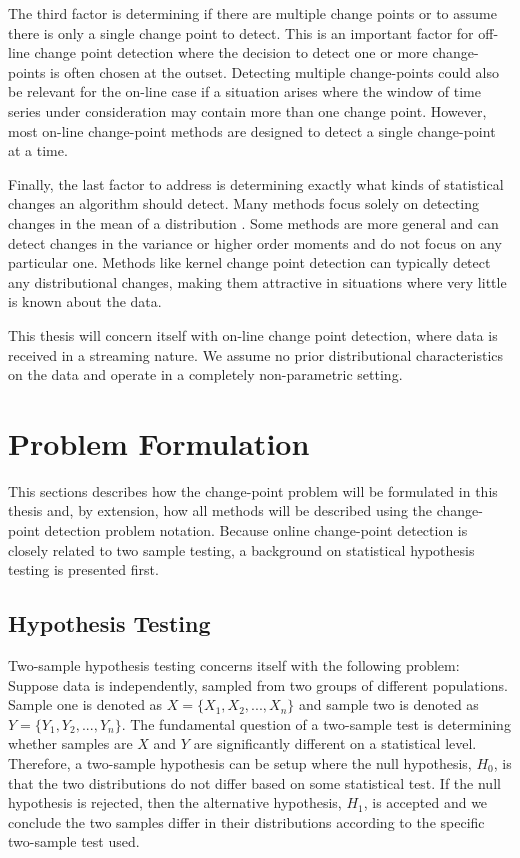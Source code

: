 The third factor is determining if there are multiple change points or to assume there is only a single change point to detect. This is an important  factor for off-line change point detection where the decision to detect one or more change-points is often chosen at the outset.  Detecting multiple change-points could also be relevant for the on-line case if a situation arises where the window of time series under consideration may contain more than one change point. However, most on-line change-point methods are designed to detect a single change-point at a time.

Finally, the last factor to address is determining exactly what kinds of statistical changes an algorithm should detect. Many methods focus solely on detecting changes in the mean of a distribution \cite{lee2010change}. Some methods are more general and can detect changes in the variance or higher order moments and do not focus on any particular one. Methods like kernel change point detection can typically detect any distributional changes, making them attractive in situations where very little is known about the data.

This thesis will concern itself with on-line change point detection, where data is received in a streaming nature. We assume no prior distributional characteristics on the data and operate in a completely non-parametric setting. 

\section{Problem Formulation}
This sections describes how the change-point problem will be formulated in this thesis and, by extension, how all methods will be described using the change-point detection problem notation. Because online change-point detection is closely related to two sample testing, a background on statistical hypothesis testing is presented first. 

\subsection{Hypothesis Testing}

Two-sample hypothesis testing concerns itself with the following problem: Suppose data is independently, sampled from two groups of different populations. Sample one is denoted as  $X=\{X_1, X_2, ...,X_n\}$ and sample two is denoted as $Y=\{Y_1, Y_2, ...,Y_n\}$. The fundamental question of a two-sample test is determining whether samples are $X$ and $Y$ are significantly different on a statistical level. Therefore, a two-sample hypothesis can be setup where the null hypothesis, $H_0$, is that the two distributions do not differ based on some statistical test. If the null hypothesis is rejected, then the alternative hypothesis, $H_1$, is accepted and we conclude the two samples differ in their distributions according to the specific two-sample test used.

